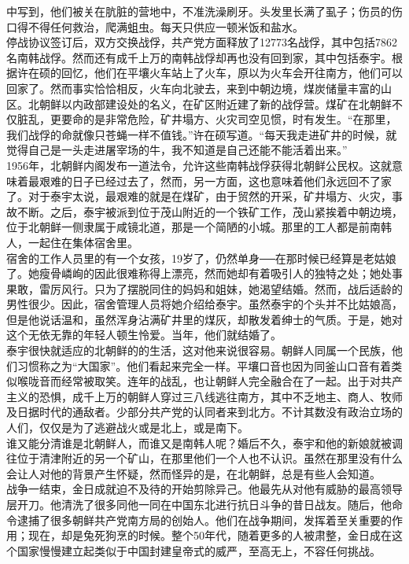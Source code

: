 中写到，他们被关在肮脏的营地中，不准洗澡刷牙。头发里长满了虱子；伤员的伤口得不得任何救治，爬满蛆虫。每天只供应一顿米饭和盐水。\\

停战协议签订后，双方交换战俘，共产党方面释放了12773名战俘，其中包括7862名南韩战俘。然而还有成千上万的南韩战俘却再也没有回到家，其中包括泰宇。根据许在硕的回忆，他们在平壤火车站上了火车，原以为火车会开往南方，他们可以回家了。然而事实恰恰相反，火车向北驶去，来到中朝边境，煤炭储量丰富的山区。北朝鲜以内政部建设处的名义，在矿区附近建了新的战俘营。煤矿在北朝鲜不仅脏乱，更要命的是非常危险，矿井塌方、火灾司空见惯，时有发生。“在那里，我们战俘的命就像只苍蝇一样不值钱。”许在硕写道。“每天我走进矿井的时候，就觉得自己是一头走进屠宰场的牛，我不知道是自己还能不能活着出来。”\\

1956年，北朝鲜内阁发布一道法令，允许这些南韩战俘获得北朝鲜公民权。这就意味着最艰难的日子已经过去了，然而，另一方面，这也意味着他们永远回不了家了。对于泰宇太说，最艰难的就是在煤矿，由于贸然的开采，矿井塌方、火灾，事故不断。之后，泰宇被派到位于茂山附近的一个铁矿工作，茂山紧挨着中朝边境，位于北朝鲜一侧隶属于咸镜北道，那是一个简陋的小城。那里的工人都是前南韩人，一起住在集体宿舍里。\\

宿舍的工作人员里的有一个女孩，19岁了，仍然单身──在那时候已经算是老姑娘了。她瘦骨嶙峋的因此很难称得上漂亮，然而她却有着吸引人的独特之处；她处事果敢，雷厉风行。只为了摆脱同住的妈妈和姐妹，她渴望结婚。然而，战后适龄的男性很少。因此，宿舍管理人员将她介绍给泰宇。虽然泰宇的个头并不比姑娘高，但是他说话温和，虽然浑身沾满矿井里的煤灰，却散发着绅士的气质。于是，她对这个无依无靠的年轻人顿生怜爱。当年，他们就结婚了。\\

泰宇很快就适应的北朝鲜的的生活，这对他来说很容易。朝鲜人同属一个民族，他们习惯称之为“大国家”。他们看起来完全一样。平壤口音也因为同釜山口音有着类似喉咙音而经常被取笑。连年的战乱，也让朝鲜人完全融合在了一起。出于对共产主义的恐惧，成千上万的朝鲜人穿过三八线逃往南方，其中不乏地主、商人、牧师及日据时代的通敌者。少部分共产党的认同者来到北方。不计其数没有政治立场的人们，仅仅是为了逃避战火或是北上，或是南下。\\

谁又能分清谁是北朝鲜人，而谁又是南韩人呢？婚后不久，泰宇和他的新娘就被调往位于清津附近的另一个矿山，在那里他们一个人也不认识。虽然在那里没有什么会让人对他的背景产生怀疑，然而怪异的是，在北朝鲜，总是有些人会知道。\\

战争一结束，金日成就迫不及待的开始剪除异己。他最先从对他有威胁的最高领导层开刀。他清洗了很多同他一同在中国东北进行抗日斗争的昔日战友。随后，他命令逮捕了很多朝鲜共产党南方局的创始人。他们在战争期间，发挥着至关重要的作用；现在，却是兔死狗烹的时候。整个50年代，随着更多的人被肃整，金日成在这个国家慢慢建立起类似于中国封建皇帝式的威严，至高无上，不容任何挑战。\\

